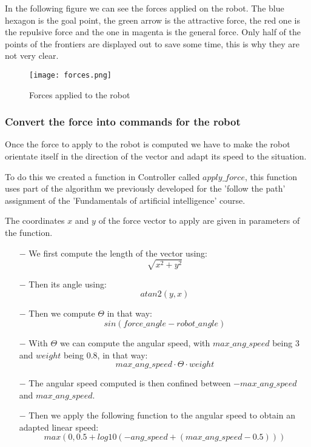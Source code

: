 In the following figure we can see the forces applied on the robot.
The blue hexagon is the goal point, the green arrow is the attractive force, the red one is the repulsive force and the one in magenta is the general force.
Only half of the points of the frontiers are displayed out to save some time, this is why they are not very clear.

\FloatBarrier
\begin{figure}
    \centering\texttt{[image: forces.png]}
    \label{fig:forces}
    \caption{Forces applied to the robot}
\end{figure}
\FloatBarrier

\subsubsection{Convert the force into commands for the robot}

Once the force to apply to the robot is computed we have to make the robot orientate itself in the direction of the vector and adapt its speed to the situation.

To do this we created a function in Controller called $apply\_force$, this function uses part of the algorithm we previously developed for the 'follow the path' assignment of the 'Fundamentals of artificial intelligence' course.

The coordinates $x$ and $y$ of the force vector to apply are given in parameters of the function.

\begin{itemize}
    \item[$-$] We first compute the length of the vector using:
        $$\sqrt{x^2 + y^2}$$
    \item[$-$] Then its angle using:
        $$atan2(y, x)$$
    \item[$-$] Then we compute $\Theta$ in that way:
        $$sin(force\_angle - robot\_angle)$$
    \item[$-$] With $\Theta$ we can compute the angular speed, with $max\_ang\_speed$ being $3$ and $weight$ being $0.8$, in that way:
        $$max\_ang\_speed \cdot \Theta \cdot weight$$
    \item[$-$] The angular speed computed is then confined between $-max\_ang\_speed$ and $max\_ang\_speed$.
    \item[$-$] Then we apply the following function to the angular speed to obtain an adapted linear speed:
        $$max(0, 0.5 + log10(-ang\_speed + (max\_ang\_speed - 0.5)))$$
\end{itemize}

